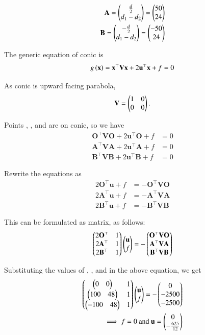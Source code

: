 \documentclass[journal,12pt,twocolumn]{IEEEtran}
\renewcommand{\vec}[1]{\boldsymbol{\mathbf{#1}}}
\begin{document}
\begin{align}
    \vec{A} = \myvec{\frac{d}{2}\\d_1-d_2} = \myvec{50\\24} \\
    \vec{B} = \myvec{-\frac{d}{2}\\d_1-d_2} = \myvec{-50\\24}
\end{align}

The generic equation of conic is
\begin{align}
    g\brak{\vec{x}} = \vec{x}^{\top}\vec{V}\vec{x} + 2\vec{u}^{\top}\vec{x} + f = 0 
\end{align}

As conic is upward facing parabola,
\begin{align}
    \vec{V} = \myvec{1&0\\0&0}.
\end{align}

Points \vec{O}, \vec{A}, and \vec{B} are on conic, so we have
\begin{align}
	\vec{O}^{\top}\vec{V}\vec{O} + 2\vec{u}^{\top}\vec{O} + f &= 0\\
	\vec{A}^{\top}\vec{V}\vec{A} + 2\vec{u}^{\top}\vec{A} + f &= 0\\
	\vec{B}^{\top}\vec{V}\vec{B} + 2\vec{u}^{\top}\vec{B} + f &= 0	 
\end{align}

Rewrite the equations as
\begin{align}
	2\vec{O}^{\top}\vec{u} + f &= - \vec{O}^{\top}\vec{V}\vec{O}\\
	2\vec{A}^{\top}\vec{u} + f &= - \vec{A}^{\top}\vec{V}\vec{A}\\
	2\vec{B}^{\top}\vec{u} + f &= - \vec{B}^{\top}\vec{V}\vec{B}	
\end{align}

This can be formulated as matrix, as follows:
\begin{align}
	\myvec{2\vec{O}^{\top} & 1\\ 2\vec{A}^{\top} & 1\\ 2\vec{B}^{\top} & 1}\myvec{\vec{u} \\ f} = -\myvec{\vec{O}^{\top}\vec{V}\vec{O}\\ \vec{A}^{\top}\vec{V}\vec{A}\\ \vec{B}^{\top}\vec{V}\vec{B}}
\end{align}

Substituting the values of \vec{O}, \vec{A}, and \vec{B} in the above equation, we get
\begin{align}
    \myvec{\myvec{0&0}&1\\ \myvec{100&48}&1\\ \myvec{-100&48}&1}\myvec{\vec{u} \\ f} = -\myvec{0\\-2500\\-2500}\\
    \implies f = 0 \text{ and } \vec{u} = \myvec{0\\-\frac{625}{12}}
\end{align}
\end{document}
